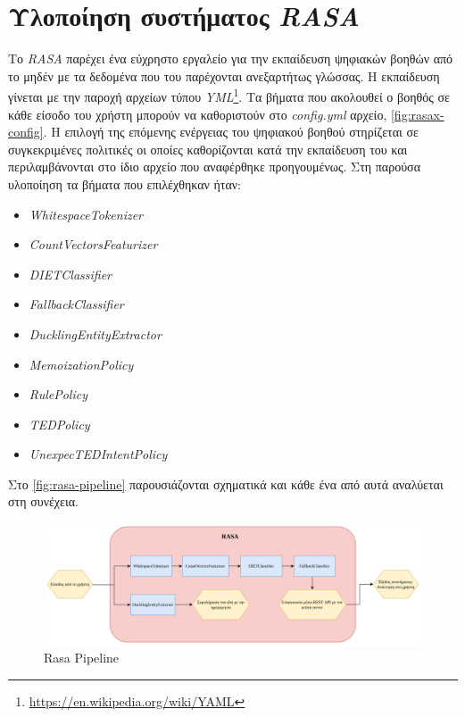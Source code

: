 \section{Υλοποίηση συστήματος \emph{RASA}}
\label{sec:rasa_impl}
Το \emph{RASA} παρέχει ένα εύχρηστο εργαλείο για την εκπαίδευση ψηφιακών βοηθών από το μηδέν με τα δεδομένα που του παρέχονται ανεξαρτήτως γλώσσας. Η εκπαίδευση γίνεται με την παροχή αρχείων τύπου \emph{YML}\footnote{\url{https://en.wikipedia.org/wiki/YAML}}. Τα βήματα που ακολουθεί ο βοηθός σε κάθε είσοδο του χρήστη μπορούν να καθοριστούν στο \emph{config.yml} αρχείο, \autoref{fig:rasax-config}. Η επιλογή της επόμενης ενέργειας του ψηφιακού βοηθού στηρίζεται σε συγκεκριμένες πολιτικές οι οποίες καθορίζονται κατά την εκπαίδευση του και περιλαμβάνονται στο ίδιο αρχείο που αναφέρθηκε προηγουμένως. Στη παρούσα υλοποίηση τα βήματα που επιλέχθηκαν ήταν:
\begin{multicols}{2}
\begin{itemize}
    \item \emph{WhitespaceTokenizer}
    \item \emph{CountVectorsFeaturizer}
    \item \emph{DIETClassifier}
    \item \emph{FallbackClassifier}
    \item \emph{DucklingEntityExtractor}
    \item \emph{MemoizationPolicy}
    \item \emph{RulePolicy}
    \item \emph{TEDPolicy}
    \item \emph{UnexpecTEDIntentPolicy}
\end{itemize}
\end{multicols}
Στο \autoref{fig:rasa-pipeline} παρουσιάζονται σχηματικά και κάθε ένα από αυτά αναλύεται στη συνέχεια.

\begin{figure}[!ht]
  \centering
  \captionsetup{justification=centering}
  \includegraphics[width=1\textwidth]{images/chapter4/rasa.png}
  \caption{Rasa Pipeline}
  \label{fig:rasa-pipeline}
\end{figure}
\noindent

